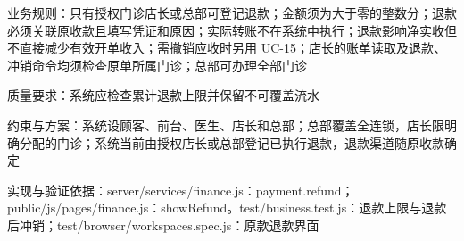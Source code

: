 \documentclass[UTF8,12pt,a4paper,fontset=none]{ctexart}
\begin{document}
业务规则：只有授权门诊店长或总部可登记退款；金额须为大于零的整数分；退款必须关联原收款且填写凭证和原因；实际转账不在系统中执行；退款影响净实收但不直接减少有效开单收入；需撤销应收时另用 UC-15；店长的账单读取及退款、冲销命令均须检查原单所属门诊；总部可办理全部门诊\par
质量要求：系统应检查累计退款上限并保留不可覆盖流水\par
约束与方案：系统设顾客、前台、医生、店长和总部；总部覆盖全连锁，店长限明确分配的门诊；系统当前由授权店长或总部登记已执行退款，退款渠道随原收款确定\par
实现与验证依据：server/\allowbreak{}services/\allowbreak{}finance.\allowbreak{}js：payment.\allowbreak{}refund；public/\allowbreak{}js/\allowbreak{}pages/\allowbreak{}finance.\allowbreak{}js：showRefund。test/\allowbreak{}business.\allowbreak{}test.\allowbreak{}js：退款上限与退款后冲销；test/\allowbreak{}browser/\allowbreak{}workspaces.\allowbreak{}spec.\allowbreak{}js：原款退款界面\par
{}
\end{document}

